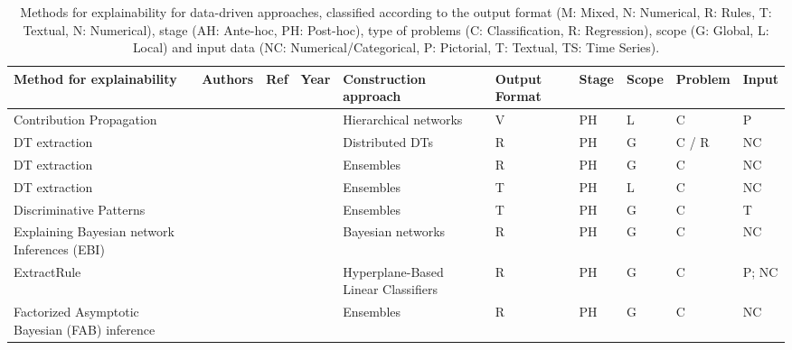 \documentclass[final,1p,times]{elsarticle}
\begin{document}
\begin{table}[htbp]
\footnotesize
    \caption{Methods for explainability for data-driven approaches, classified according to the output format (M: Mixed, N: Numerical, R: Rules, T: Textual, N: Numerical), stage (AH: Ante-hoc, PH: Post-hoc), type of problems (C: Classification, R: Regression), scope (G: Global, L: Local) and input data (NC: Numerical/Categorical, P: Pictorial, T: Textual, TS: Time Series).}
    \label{tab:data-driven}
    \begin{tabular}{m{2.3cm} m{1.4cm} m{0.5cm} m{0.5cm} m{1.5cm} m{0.85cm} m{0.5cm} m{0.6cm} m{0.8cm} m{0.8cm}}
    \hline
    Method for \newline explainability & Authors & Ref & Year & Construction approach & Output Format & Stage & Scope & Problem & Input\\
    \hline
    Contribution Propagation &  \citeauthor{Landecker2013interpreting} &  \cite{Landecker2013interpreting} &  \citeyear{Landecker2013interpreting} & Hierarchical networks & V & PH & L & C & P\\
    DT extraction &  \citeauthor{andrzejak2013interpretable} &  \cite{andrzejak2013interpretable} &  \citeyear{andrzejak2013interpretable} & Distributed DTs & R & PH & G & C / R & NC\\
    DT extraction &  \citeauthor{ferri2002ensemble, van2007seeing} &  \cite{ferri2002ensemble,van2007seeing} &  \citeyear{ferri2002ensemble,van2007seeing} & Ensembles & R & PH & G & C & NC\\
    DT extraction &  \citeauthor{alonso2018explainable} &  \cite{alonso2018explainable} &  \citeyear{alonso2018explainable} & Ensembles & T & PH & L & C & NC\\
    Discriminative Patterns &  \citeauthor{gao2017interpretable} &  \cite{gao2017interpretable} &  \citeyear{gao2017interpretable}  & Ensembles & T & PH & G & C & T\\
    Explaining Bayesian network Inferences (EBI) &  \citeauthor{yap2008explaining} &  \cite{yap2008explaining} &  \citeyear{yap2008explaining} & Bayesian networks & R & PH & G & C & NC\\
    ExtractRule &  \citeauthor{fung2005rule} &  \cite{fung2005rule} &  \citeyear{fung2005rule} & Hyperplane-Based Linear Classifiers & R & PH & G & C & P; NC\\
    Factorized Asymptotic Bayesian (FAB) inference  &  \citeauthor{hara2018making} &  \cite{hara2018making} &  \citeyear{hara2018making}  & Ensembles & R & PH & G & C & NC\\

\end{tabular}
\end{table}
\end{document}

